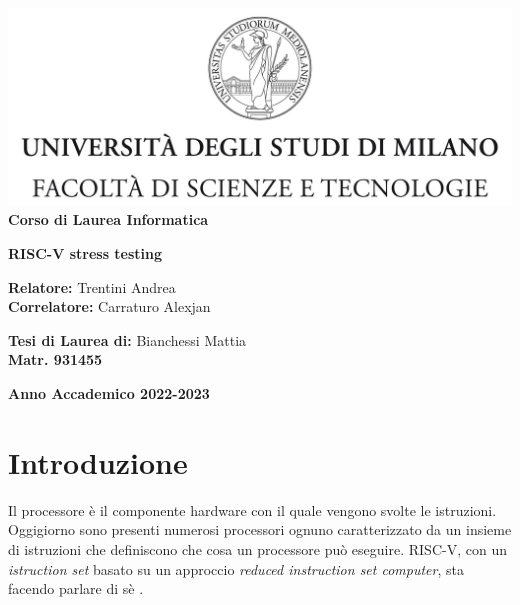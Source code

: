 \documentclass[12pt, a4paper]{report}
\begin{document}
\begin{titlepage}
\begin{center}
\includegraphics[width=\textwidth]{Img/Logo.jpg}\\
{\large{\bf Corso di Laurea Informatica}}
\end{center}
\vspace{12mm}
\begin{center}

\vspace{4mm}
{\huge{\bf RISC-V stress testing}}\\
\vspace{4mm}

\end{center}
\vspace{12mm}
\begin{flushleft}
{\large{\bf Relatore:}}
{\large{Trentini Andrea}}\\
\vspace{4mm}
{\large{\bf Correlatore:}}
{\large{Carraturo Alexjan}}\\
\end{flushleft}
\vspace{12mm}
\begin{flushright}
{\large{\bf Tesi di Laurea di:}}
{\large{Bianchessi Mattia}}\\
{\large{\bf Matr. 931455}}\\
\end{flushright}
\vspace{4mm}
\begin{center}
{\large{\bf Anno Accademico 2022-2023}}
\end{center}
\end{titlepage}


\listoftodos


\tableofcontents
\listoffigures
\listoftables
\lstlistoflistings



\chapter{Introduzione}
Il processore è il componente hardware con il quale vengono svolte le istruzioni.
Oggigiorno sono presenti numerosi processori ognuno caratterizzato da un insieme di istruzioni che definiscono che cosa un processore può eseguire. RISC-V, con un \textit{istruction set} basato su un approccio \textit{reduced instruction set computer}\cite{RISCOverview}, sta facendo parlare di sè \cite{RISCVHistory}.
\end{document}
